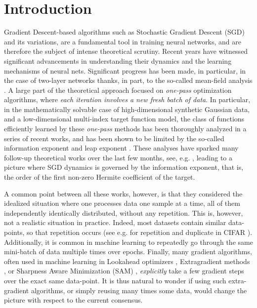 \section{Introduction}
Gradient Descent-based algorithms such as  Stochastic Gradient Descent (SGD) and its variations, are a fundamental tool in training neural networks, and are therefore the subject of intense theoretical scrutiny. Recent years have witnessed significant advancements in understanding their dynamics and the learning mechanisms of neural nets. Significant progress has been made, in particular, in the case of two-layer networks thanks, in part, to the so-called mean-field analysis \citep{mei2018mean,chizat2018global,rotskoff2022trainability,sirignano2020mean}. A large part of the theoretical approach focused on \emph{one-pass} optimization algorithms, where \emph{each iteration involves a new fresh batch of data}. In particular, in the mathematically solvable case of  high-dimensional synthetic Gaussian data, and a low-dimensional multi-index target function model, the class of functions efficiently learned by these \textit{one-pass} methods has been thoroughly analyzed in a series of recent works, and has been shown to be limited by the so-called information exponent \citep{arous2021online} and leap exponent \citep{abbe2022merged,abbe2023sgd}. These analyses have sparked many follow-up theoretical works over the last few months, see, e.g. \cite{damian2022neural,damian2023smoothing,dandi2023how,bietti2023learning,ba2023learning,moniri2023theory,mousavihosseini2023gradient,zweig2023symmetric}, leading to a picture where SGD dynamics is governed by the information exponent, that is, the order of the first non-zero Hermite coefficient of the target.

A common point between all these works, however, is that they considered the idealized situation where one processes data one sample at a time, all of them independently identically distributed, without any repetition. This is, however, not a realistic situation in practice. Indeed, most datasets contain similar data-points, so that repetition occurs (see e.g. for repetition and duplicate in CIFAR \citep{barz2020do}). Additionally, it is common in machine learning to  repeatedly go through the same mini-batch of data multiple times over epochs. Finally, many gradient algorithms, often used in machine learning in Lookahead optimizers \citep{zhang2019lookahead}, Extragradient methods \citep{korpelevi1976extragradient}, or Sharpness Aware Minimization (SAM) \citep{foret2021sharpness}, \emph{explicitly} take a few gradient steps over the exact same data-point. It is thus natural to wonder if using such extra-gradient algorithms, or simply reusing many times some data, would change the picture with respect to the current consensus.


